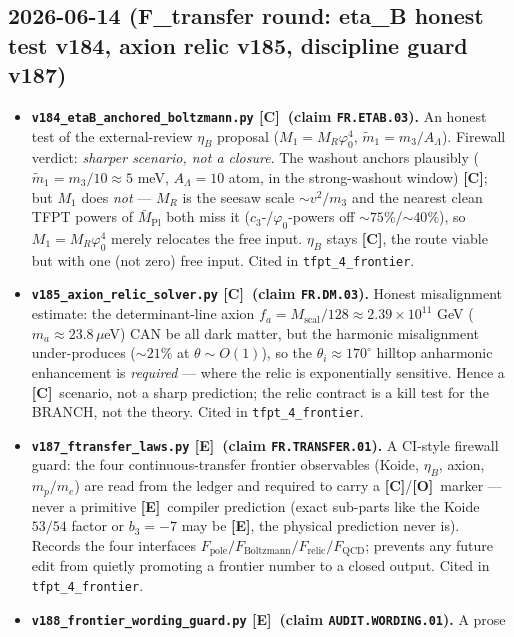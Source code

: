 \documentclass[11pt]{article}
\providecommand{\mE}{\textbf{[E]}}\providecommand{\mC}{\textbf{[C]}}
\providecommand{\mO}{\textbf{[O]}}\providecommand{\mX}{\textbf{[X]}}
\begin{document}
\subsection*{2026-06-14 (F\_transfer round: eta\_B honest test v184, axion relic v185, discipline guard v187)}
\begin{itemize}
\item \textbf{\texttt{v184\_etaB\_anchored\_boltzmann.py} \mC\ (claim \texttt{FR.ETAB.03}).} An honest
  test of the external-review $\eta_B$ proposal ($M_1=M_R\varphi_0^4$, $\tilde m_1=m_3/A_\Lambda$).
  Firewall verdict: \emph{sharper scenario, not a closure}. The washout anchors plausibly
  ($\tilde m_1=m_3/10\approx5$ meV, $A_\Lambda=10$ atom, in the strong-washout window) \mC; but $M_1$
  does \emph{not} --- $M_R$ is the seesaw scale $\sim v^2/m_3$ and the nearest clean TFPT powers of
  $\bar M_{\mathrm{Pl}}$ both miss it ($c_3$-/$\varphi_0$-powers off ${\sim}75\%$/${\sim}40\%$), so
  $M_1=M_R\varphi_0^4$ merely relocates the free input. $\eta_B$ stays \mC, the route viable but with one
  (not zero) free input. Cited in \texttt{tfpt\_4\_frontier}.
\item \textbf{\texttt{v185\_axion\_relic\_solver.py} \mC\ (claim \texttt{FR.DM.03}).} Honest misalignment
  estimate: the determinant-line axion $f_a=M_{\mathrm{scal}}/128\approx2.39{\times}10^{11}$ GeV
  ($m_a\approx23.8\,\mu$eV) CAN be all dark matter, but the harmonic misalignment under-produces
  (${\sim}21\%$ at $\theta\sim O(1)$), so the $\theta_i\approx170^\circ$ hilltop anharmonic enhancement is
  \emph{required} --- where the relic is exponentially sensitive. Hence a \mC\ scenario, not a sharp
  prediction; the relic contract is a kill test for the BRANCH, not the theory. Cited in
  \texttt{tfpt\_4\_frontier}.
\item \textbf{\texttt{v187\_ftransfer\_laws.py} \mE\ (claim \texttt{FR.TRANSFER.01}).} A CI-style
  firewall guard: the four continuous-transfer frontier observables (Koide, $\eta_B$, axion,
  $m_p/m_e$) are read from the ledger and required to carry a \mC/\mO\ marker --- never a primitive
  \mE\ compiler prediction (exact sub-parts like the Koide $53/54$ factor or $b_3=-7$ may be \mE, the
  physical prediction never is). Records the four interfaces $F_{\mathrm{pole}}/F_{\mathrm{Boltzmann}}/
  F_{\mathrm{relic}}/F_{\mathrm{QCD}}$; prevents any future edit from quietly promoting a frontier
  number to a closed output. Cited in \texttt{tfpt\_4\_frontier}.
\item \textbf{\texttt{v188\_frontier\_wording\_guard.py} \mE\ (claim \texttt{AUDIT.WORDING.01}).} A prose

\end{itemize}
\end{document}
